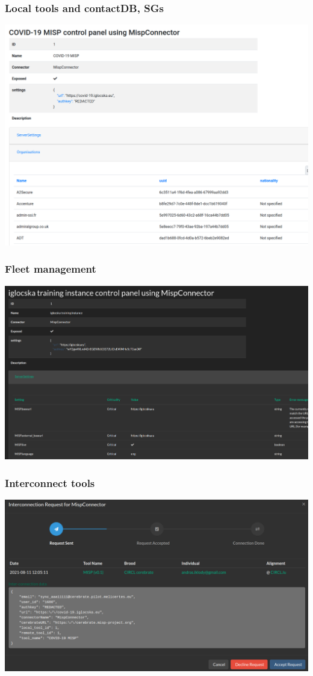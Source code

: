 \begin{frame}
\frametitle{Local tools and contactDB, SGs}
\begin{center}
    \includegraphics[scale=0.28]{misp_orgs.png}
\end{center}
\end{frame}

\begin{frame}
\frametitle{Fleet management}
\begin{center}
    \includegraphics[scale=0.25]{local_tool_settings.png}
\end{center}
\end{frame}


\begin{frame}
\frametitle{Interconnect tools}
\begin{center}
    \includegraphics[scale=0.3]{interconnection.png}
\end{center}
\end{frame}


